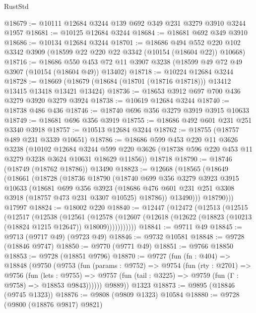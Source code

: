 \begin{lexlean}{RustStd}
\begin{coremodule}
@18679 := @10111 @12684 @3244 @139 @692 @349 @231 @3279 @3910 @3244 @1957
@18681 := @10125 @12684 @3244
@18684 := @18681 @692 @349 @3910
@18686 := @10134 @12684 @3244
@18701 := @18686
    @494
    @552
    @220
    @102
    @3342
    @3909
    (@18599 @22 @220 @22 @3342 (@10154 (@18604 @22)) @10668)
@18716 := @18686
    @550
    @453
    @72
    @11
    @3907
    @3238
    (@18599 @49 @72 @49 @3907 (@10154 (@18604 @49)) @13402)
@18718 := @10224 @12684 @3244
@18728 := @18669 (@18679 (@18684 (@18701 (@18716 @18718))) @13412 @13415 @13418 @13421 @13424)
@18736 := @18653 @3912 @697 @700 @436 @3279 @3920 @3279 @3924
@18738 := @10619 @12684 @3244
@18740 := @18738 @486 @436
@18746 := @18740 @696 @356 @3279 @3919 @3915 @10633
@18749 := @18681 @696 @356 @3919
@18755 := @18686 @492 @601 @231 @251 @3340 @3918
@18757 := @10513 @12684 @3244
@18762 := @18755 (@18757 @489 @231 @3339 @10651)
@18786 := @18686
    @599
    @453
    @220
    @11
    @3626
    @3238
    (@10102
      @12684
      @3244
      @599
      @220
      @3626
      (@18738 @596 @220 @453 @11 @3279 @3238 @3624 @10631 @18629 @11856))
    @18718
@18790 := @18746 (@18749 (@18762 @18786)) @13490
@18823 := @12668
    (@18565
      (@18649
        (@18661
          (@18728
            (@18736
              @18790
              (@18740
                @699
                @356
                @3279
                @3923
                @3915
                @10633
                (@18681
                  @699
                  @356
                  @3923
                  (@18686 @476 @601 @231 @251 @3308 @3918 (@18757 @473 @231 @3307 @10525) @18786))
                @13490)))
          @18790)))
    @17997
@18824 := @18002 @220
@18840 := @12447
    (@12472
      (@12513
        (@12515
          (@12517
            (@12538
              (@12561
                (@12578
                  (@12607 (@12618 (@12622 (@18823 (@10213 (@18824 @1215 @12647)) @18009)))))))))))
@18841 := @9711 @49
@18845 := @9713 (@9717 @49) (@9723 @49)
@18846 := @9732 @10581
@18848 := @9728 (@18846 @9747)
@18850 := @9770 (@9771 @49)
@18851 := @9766 @18850
@18853 := @9728 (@18851 @9796)
@18870 := @9727
    (fun (fn : @404) =>
    @18848
      (@9750
        (@9753
          (fun (params : @9752) =>
          @9754
            (fun (rty : @2701) =>
            @9756
              (fun (lets : @9755) =>
              @9757 (fun (tail : @3225) => @9759 (fun (Γ : @9758) => @18853 @9843))))))
        @9889))
    @1323
@18873 := @9895 (@18846 (@9745 @1323))
@18876 := @9808 (@9809 @1323) @10584
@18880 := @9728 (@9800 (@18876 @9817) @9821)

\end{coremodule}
\end{lexlean}
